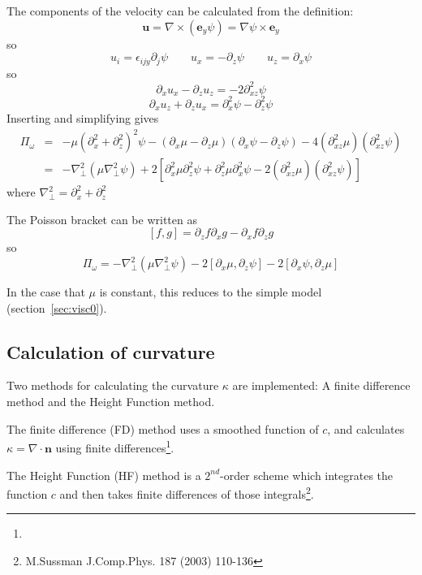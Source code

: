 \documentclass[12pt,a4paper]{article}
\newcommand{\lr}[1]{\left( #1 \right)}
\newcommand{\slr}[1]{\left[ #1 \right]}
\newcommand{\ey}{\ensuremath{\mathbf{e}_y}}
\begin{document}
The components of the velocity can be calculated from the definition:
\begin{equation}
  \mathbf{u} = \nabla\times\lr{\ey \psi} = \nabla\psi \times\ey
\end{equation}
so
\begin{equation}
  u_i = \epsilon_{ijy}\partial_j \psi \qquad u_x = -\partial_z\psi \qquad u_z = \partial_x\psi
\end{equation}
so
\[
\partial_x u_x - \partial_z u_z = -2\partial_{xz}^2\psi
\]
\[
\partial_x u_z + \partial_zu_x = \partial_x^2\psi - \partial_z^2\psi
\]
Inserting and simplifying gives
\begin{eqnarray}
  \Pi_\omega &=& -\mu\lr{\partial_x^2 + \partial_z^2}^2\psi - \lr{\partial_x \mu - \partial_z\mu}\lr{\partial_x \psi - \partial_z \psi} - 4\lr{\partial_{xz}^2\mu}\lr{\partial_{xz}^2\psi} \\
  &=& -\nabla_\perp^2\lr{\mu \nabla_\perp^2\psi} + 2\slr{\partial_x^2\mu \partial_z^2\psi + \partial_z^2\mu \partial_x^2\psi - 2\lr{\partial_{xz}^2\mu}\lr{\partial_{xz}^2\psi}}
\end{eqnarray}
where $\nabla_\perp^2 = \partial_x^2 + \partial_z^2$

The Poisson bracket can be written as
\begin{equation}
\left[f, g\right] = \partial_zf\partial_xg - \partial_xf\partial_zg
\end{equation}
so
\begin{equation}
  \Pi_\omega = -\nabla_\perp^2\lr{\mu \nabla_\perp^2\psi} - 2\slr{\partial_x\mu,\partial_z\psi} - 2\slr{\partial_x\psi, \partial_z\mu}
\end{equation}

In the case that $\mu$ is constant, this reduces to the simple model (section~\ref{sec:visc0}).

\subsection{Calculation of curvature}
\label{sec:curvature}

Two methods for calculating the curvature $\kappa$ are implemented: A finite difference method and the Height Function method. 

The finite difference (FD) method uses a smoothed function of $c$, and calculates $\kappa = \nabla\cdot\mathbf{n}$ using finite differences\footnote{}.

The Height Function (HF) method is a $2^{nd}$-order scheme which integrates the function $c$ and then takes finite differences of those integrals\footnote{M.Sussman J.Comp.Phys. 187 (2003) 110-136}.
\end{document}
